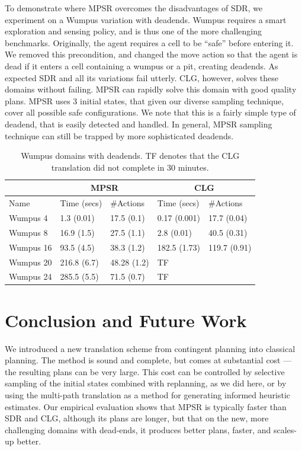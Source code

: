 \documentclass[letterpaper]{article}
\numberwithin{equation}{section}	%
\begin{document}
To demonstrate where MPSR overcomes the disadvantages of SDR, we experiment on a Wumpus variation with deadends.
Wumpus requires a smart exploration and sensing policy, and is thus one of the more challenging benchmarks. Originally, the agent requires a cell to be ``safe'' before entering it. We removed this precondition, and changed the move action so that the agent is dead if it enters a cell containing a wumpus or a pit, creating deadends. As expected SDR and all its variations fail utterly. CLG, however, solves these domains without failing. MPSR can rapidly solve this domain with good quality plans. MPSR uses 3 initial states, that given our diverse sampling technique, cover all possible safe configurations. We note that this is a fairly simple type of deadend, that is easily detected and handled. In general, MPSR sampling technique can still be trapped by more sophisticated deadends.


\begin{table}[htb]
\centering
\caption{
\small
Wumpus domains with deadends. TF denotes that the CLG translation did not complete in 30 minutes.}
\scriptsize
\begin{tabular}{|l||l|l||l|l|}
\hline
	&  \multicolumn{2}{c||}{MPSR} &	\multicolumn{2}{c|}{CLG}	\\ \hline
Name & Time (secs) & \#Actions&  Time (secs) & \#Actions \\
\hline
Wumpus 4 & 1.3 (0.01)& 17.5 (0.1) & 0.17 (0.001) & 17.7 (0.04) \\
Wumpus 8 & 16.9 (1.5)& 27.5 (1.1) & 2.8 (0.01) & 40.5 (0.31) \\
Wumpus 16 &93.5 (4.5) &38.3 (1.2) &  182.5 (1.73) & 119.7 (0.91) \\
Wumpus 20 &216.8 (6.7) &48.28 (1.2) & TF & \\
Wumpus 24 &285.5 (5.5) &71.5 (0.7) &  TF &  \\
\hline
\end{tabular}
\label{tbl:Deadends}
\end{table}




\section{Conclusion and Future Work}

We introduced a new translation scheme from contingent planning into classical planning. The method is sound and complete, but comes at substantial cost --- the resulting plans can be very large. This cost can be controlled by selective sampling of the initial states combined with replanning, as we did here, or by using the multi-path translation as a method for generating informed heuristic estimates. Our empirical evaluation shows that MPSR is typically faster than SDR and CLG,
although its plans are longer, but that on the new, more challenging domains with dead-ends, it produces better plans, faster, and scales-up better.
\end{document}
